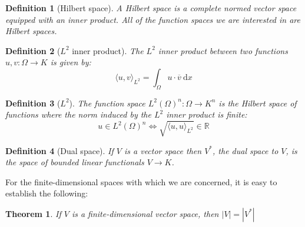\documentclass[a4paper,11pt]{article}
\newtheorem{theorem}{Theorem}[section]
\newtheorem{definition}{Definition}[section]
\begin{document}
\begin{definition}[Hilbert space]
    A Hilbert space is a complete normed vector space equipped with an inner product. All of the function spaces we are interested in are Hilbert spaces.
\end{definition}

\begin{definition}[$L^2$ inner product]
    The $L^2$ inner product between two functions $u, v: \Omega\rightarrow K$ is given by:
    \begin{equation} 
        \langle u, v \rangle_{L^2} = \int_{\Omega} u\cdot \overline{v}\ \mathrm{d}x 
    \end{equation} 
\end{definition}

\begin{definition}[$L^2$]
    The function space $L^2(\Omega)^n : \Omega\rightarrow K^n$ is the Hilbert space of functions where the norm induced by the $L^2$ inner product is finite:
    \begin{equation} 
        u\in L^2(\Omega)^n \Leftrightarrow \sqrt{\langle u,u\rangle_{L^2}}\in \mathbb{R}
    \end{equation} 
\end{definition}

\begin{definition}[Dual space]\label{dualspace}
    If $V$ is a vector space then $V^*$, the dual space to $V$, is the space of bounded linear functionals $V\rightarrow K$.
\end{definition}
For the finite-dimensional spaces with which we are concerned, it is easy to establish the following:
\begin{theorem}
If $V$ is a finite-dimensional vector space, then $|V| = |V^*|$
\end{theorem}
\end{document}
